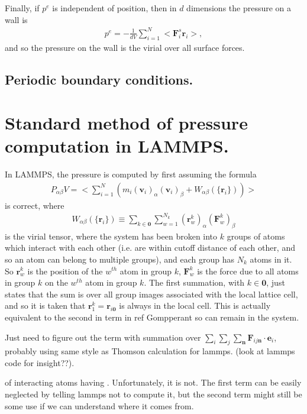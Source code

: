 \documentclass[twocolumn,amsmath,amssymb,aps]{revtex4-1}%
\begin{document}
Finally, if $p^e$ is independent of position, then in $d$
dimensions the pressure on a wall is
\begin{align}\label{eq:pwall}
  p^e
  =-\frac{1}{dV}\sum_{i=1}^{N}<\bm{F}_i^{s}\bm{r}_i>,
\end{align}
and so the pressure on the wall is the virial over all
surface forces.

\subsection{Periodic boundary conditions.}

\section{Standard method of pressure computation in LAMMPS.}

In LAMMPS, the pressure is computed by first assuming the formula
\begin{align}
  P_{\alpha\beta}V = \bigg<\sum_{i=1}^N(m_i(\bm{v}_i)_{\alpha}
  (\bm{v}_i)_{\beta}+W_{\alpha\beta}(\{\bm{r}_i\}))\bigg>
\end{align}
is correct, where
\begin{align}
  W_{\alpha\beta}(\{\bm{r}_i\})\equiv\sum_{k\in\bm{0}}
  \sum_{w=1}^{N_k}(\bm{r}_w^k)_{\alpha}
    (\bm{F}_w^k)_{\beta}
\end{align}
is the virial tensor, where the system has been broken into
$k$ groups of atoms which interact with each other (i.e.
are within cutoff distance of each other, and so an atom can
belong to multiple groups), and each group has $N_k$ atoms in
it. So $\bm{r}_w^k$ is the position of the $w^{th}$ atom in
group $k$, $\bm{F}_w^k$ is the force due to all atoms in group
$k$ on the $w^{th}$ atom in group $k$. The first summation,
with $k\in\bm{0}$, just states that the sum is over all group
images associated with the local lattice cell, and so it is
taken that $\bm{r}_1^k=\bm{r}_{i\bm{0}}$ is always in the local
cell. This is actually equivalent to the second in term in ref
Gompperant so can remain in the system.

Just need to figure out the term with summation over
$\sum_{i}\sum_{j}\sum_{\bm{n}}\bm{F}_{ij\bm{n}}\cdot\bm{e}_i$,
probably using same style as Thomson calculation for lammps.
(look at lammps code for insight??).

of interacting atoms having
  . Unfortunately, it is not. The first term can be easily
neglected by telling lammps not to compute it, but the second
term might still be some use if we can understand where it comes
from.
\end{document}
